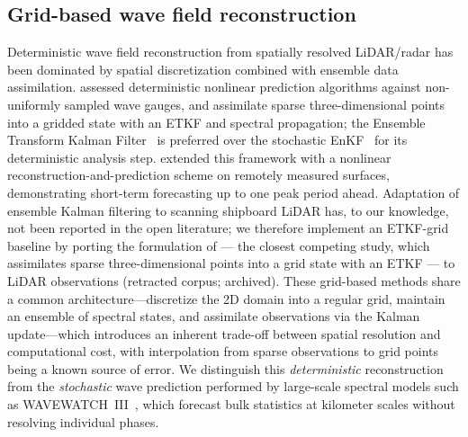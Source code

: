 \documentclass[review]{elsarticle}
\begin{document}
\subsection{Grid-based wave field reconstruction}

Deterministic wave field reconstruction from spatially resolved
LiDAR/radar has been dominated by spatial discretization combined
with ensemble data assimilation.
\citet{desmars2020} assessed deterministic nonlinear prediction algorithms against
non-uniformly sampled wave gauges, and \citet{Wang2025PointsToWaves} assimilate sparse
three-dimensional points into a gridded state with an ETKF and spectral propagation; the
Ensemble
Transform Kalman Filter~\citep{hunt2007} is preferred over the
stochastic EnKF~\citep{evensen2003} for its deterministic analysis
step.
\citet{desmars2023jfm} extended this framework with a nonlinear
reconstruction-and-prediction scheme on remotely measured surfaces,
demonstrating short-term forecasting up to one peak period ahead.
Adaptation of ensemble Kalman filtering to scanning shipboard LiDAR
has, to our knowledge, not been reported in the open literature; we
therefore implement an ETKF-grid baseline by porting the formulation of
\citet{Wang2025PointsToWaves} --- the closest competing study, which assimilates
sparse three-dimensional points into a grid state with an ETKF --- to LiDAR observations
(retracted corpus; archived).
These grid-based methods share a common architecture---discretize
the 2D domain into a regular grid, maintain an ensemble of spectral
states, and assimilate observations via the Kalman update---which
introduces an inherent trade-off between spatial resolution and
computational cost, with interpolation from sparse observations to
grid points being a known source of error.
We distinguish this \emph{deterministic} reconstruction from the
\emph{stochastic} wave prediction performed by large-scale spectral
models such as WAVEWATCH~III~\citep{tolman2009}, which forecast
bulk statistics at kilometer scales without resolving individual
phases.
\end{document}
